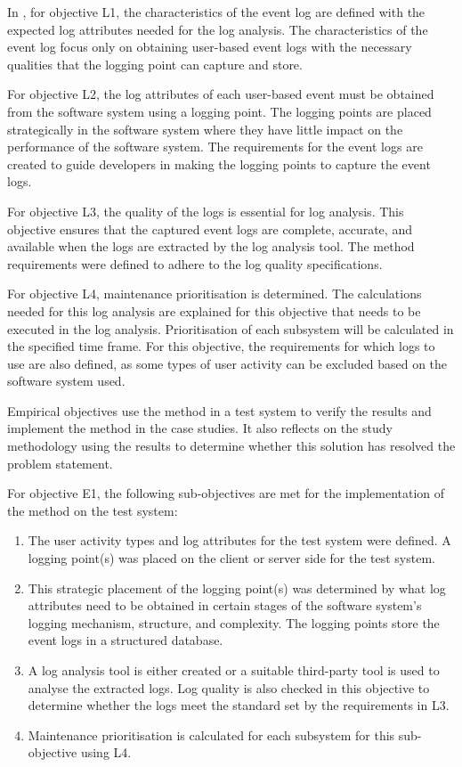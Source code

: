 \begin{enumerate}[label=\textbf{\Roman*.}]
    In , for objective L1, the characteristics of the event log are defined with the expected log attributes needed for the log analysis. The characteristics of the event log focus only on obtaining user-based event logs with the necessary qualities that the logging point can capture and store. \par For objective L2, the log attributes of each user-based event must be obtained from the software system using a logging point. The logging points are placed strategically in the software system where they have little impact on the performance of the software system. The requirements for the event logs are created to guide developers in making the logging points to capture the event logs. \par For objective L3, the quality of the logs is essential for log analysis. This objective ensures that the captured event logs are complete, accurate, and available when the logs are extracted by the log analysis tool. The method requirements were defined to adhere to the log quality specifications. \par For objective L4, maintenance prioritisation is determined. The calculations needed for this log analysis are explained for this objective that needs to be executed in the log analysis. Prioritisation of each subsystem will be calculated in the specified time frame. For this objective, the requirements for which logs to use are also defined, as some types of user activity can be excluded based on the software system used. \par Empirical objectives use the method in a test system to verify the results and implement the method in the case studies. It also reflects on the study methodology using the results to determine whether this solution has resolved the problem statement. \par For objective E1, the following sub-objectives are met for the implementation of the method on the test system:

	\begin{enumerate}
		\item The user activity types and log attributes for the test system were defined. A logging point(s) was placed on the client or server side for the test system.
		\item This strategic placement of the logging point(s) was determined by what log attributes need to be obtained in certain stages of the software system's logging mechanism, structure, and complexity. The logging points store the event logs in a structured database.
		\item A log analysis tool is either created or a suitable third-party tool is used to analyse the extracted logs. Log quality is also checked in this objective to determine whether the logs meet the standard set by the requirements in L3. 
		\item Maintenance prioritisation is calculated for each subsystem for this sub-objective using L4.
	\end{enumerate} 


\end{enumerate}
